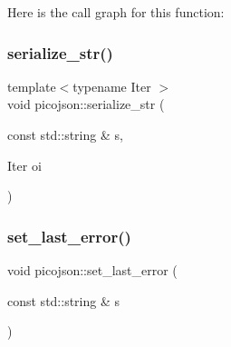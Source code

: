 Here is the call graph for this function\+:
\hypertarget{namespacepicojson_a11130e017d868857aeb016f5e3d29008}{}\label{namespacepicojson_a11130e017d868857aeb016f5e3d29008} 
\subsubsection{\texorpdfstring{serialize\+\_\+str()}{serialize\_str()}}
{\footnotesize\ttfamily template$<$typename Iter $>$ \\
void picojson\+::serialize\+\_\+str (\begin{DoxyParamCaption}\item[{const std\+::string \&}]{s,  }\item[{Iter}]{oi }\end{DoxyParamCaption})}

\hypertarget{namespacepicojson_a509585c918611015ec995d4374fee4c9}{}\label{namespacepicojson_a509585c918611015ec995d4374fee4c9} 
\subsubsection{\texorpdfstring{set\+\_\+last\+\_\+error()}{set\_last\_error()}}
{\footnotesize\ttfamily void picojson\+::set\+\_\+last\+\_\+error (\begin{DoxyParamCaption}\item[{const std\+::string \&}]{s }\end{DoxyParamCaption})\hspace{0.3cm}{\ttfamily [inline]}}

